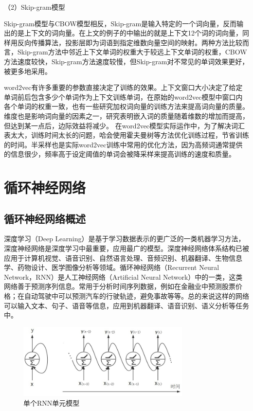 \documentclass[winfonts,master,oneside,nobackinfo]{njuthesis}
\begin{document}
（2）Skip-gram模型

Skip-gram模型与CBOW模型相反，Skip-gram是输入特定的一个词向量，反而输出的是上下文的词向量。在上文的例子的中输出的就是上下文12个词的词向量，同样用反向传播算法，投影层即为词语到指定维数向量空间的映射。两种方法比较而言，Skip-gram方法中邻近上下文单词的权重大于较远上下文单词的权重\cite{Mikolov1}，CBOW方法速度较快，Skip-gram方法速度较慢，但Skip-gram对不常见的单词效果更好，被更多地采用。

word2vec有许多重要的参数直接决定了训练的效果。上下文窗口大小决定了给定单词前后包含多少个单词作为上下文训练单词，在原始的word2vec模型中窗口内各个单词的权重一致，也有一些研究加权词向量的训练方法\cite{myh}来提高词向量的质量。维度也是影响词向量的因素之一，研究表明嵌入词的质量随着维数的增加而提高，但达到某一点后，边际效益将减少\cite{Mikolov}。
在word2vec模型实际运作中，为了解决词汇表太大，训练时间太长的问题，哈会使用霍夫曼树等方法优化训练过程，节省训练的时间。半采样也是实际word2vec训练中常用的优化方法，因为高频词通常提供的信息很少，频率高于设定阈值的单词会被降采样来提高训练的速度和质量。

\section{循环神经网络}

\subsection{循环神经网络概述}

深度学习（Deep Learning）是基于学习数据表示的更广泛的一类机器学习方法，深度神经网络是深度学习中最重要，应用最广的模型。深度神经网络体系结构已被应用于计算机视觉、语音识别、自然语言处理、音频识别、机器翻译、生物信息学、药物设计、医学图像分析等领域。循环神经网络（Recurrent Neural Network，RNN）是人工神经网络（Artificial Neural Network）中的一类，这类网络善于预测序列信息。常用于分析时间序列数据，例如在金融业中预测股票价格；在自动驾驶中可以预测汽车的行驶轨迹，避免事故等等。总的来说这样的网络可以输入文本、句子、语音等信息，应用到机器翻译、语音识别、语义分析等任务中。

\begin{figure}[h]
\centering
\includegraphics[width=0.77\textwidth]{./figure/RNN.jpg}
\caption{单个RNN单元模型}
\label{one-level-rnn}
\end{figure}
\end{document}
